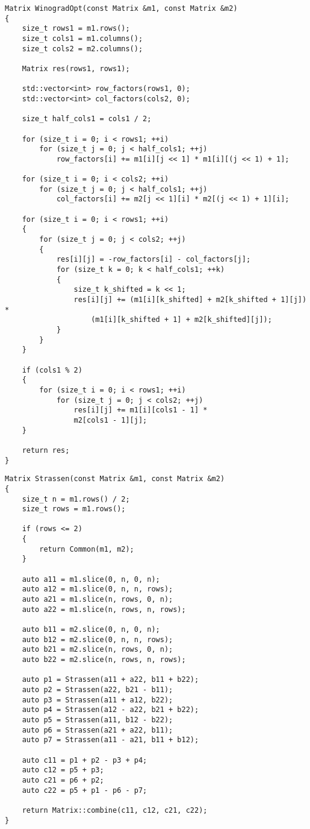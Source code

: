 \begin{lstlisting}[label={lst:winograd-opt}, caption={Реализация алгоритма Винограда с оптимизациями}]
Matrix WinogradOpt(const Matrix &m1, const Matrix &m2)
{
    size_t rows1 = m1.rows();
    size_t cols1 = m1.columns();
    size_t cols2 = m2.columns();

    Matrix res(rows1, rows1);

    std::vector<int> row_factors(rows1, 0);
    std::vector<int> col_factors(cols2, 0);

    size_t half_cols1 = cols1 / 2;

    for (size_t i = 0; i < rows1; ++i)
        for (size_t j = 0; j < half_cols1; ++j)
            row_factors[i] += m1[i][j << 1] * m1[i][(j << 1) + 1];

    for (size_t i = 0; i < cols2; ++i)
        for (size_t j = 0; j < half_cols1; ++j)
            col_factors[i] += m2[j << 1][i] * m2[(j << 1) + 1][i];

    for (size_t i = 0; i < rows1; ++i)
    {
        for (size_t j = 0; j < cols2; ++j)
        {
            res[i][j] = -row_factors[i] - col_factors[j];
            for (size_t k = 0; k < half_cols1; ++k)
            {
                size_t k_shifted = k << 1;
                res[i][j] += (m1[i][k_shifted] + m2[k_shifted + 1][j]) *
                    (m1[i][k_shifted + 1] + m2[k_shifted][j]);
            }
        }
    }

    if (cols1 % 2)
    {
        for (size_t i = 0; i < rows1; ++i)
            for (size_t j = 0; j < cols2; ++j)
                res[i][j] += m1[i][cols1 - 1] *
                m2[cols1 - 1][j];
    }

    return res;
}
\end{lstlisting}

\begin{lstlisting}[label={lst:strassen}, caption={Реализация алгоритма Штрассена}]
Matrix Strassen(const Matrix &m1, const Matrix &m2)
{
    size_t n = m1.rows() / 2;
    size_t rows = m1.rows();

    if (rows <= 2)
    {
        return Common(m1, m2);
    }

    auto a11 = m1.slice(0, n, 0, n);
    auto a12 = m1.slice(0, n, n, rows);
    auto a21 = m1.slice(n, rows, 0, n);
    auto a22 = m1.slice(n, rows, n, rows);

    auto b11 = m2.slice(0, n, 0, n);
    auto b12 = m2.slice(0, n, n, rows);
    auto b21 = m2.slice(n, rows, 0, n);
    auto b22 = m2.slice(n, rows, n, rows);

    auto p1 = Strassen(a11 + a22, b11 + b22);
    auto p2 = Strassen(a22, b21 - b11);
    auto p3 = Strassen(a11 + a12, b22);
    auto p4 = Strassen(a12 - a22, b21 + b22);
    auto p5 = Strassen(a11, b12 - b22);
    auto p6 = Strassen(a21 + a22, b11);
    auto p7 = Strassen(a11 - a21, b11 + b12);

    auto c11 = p1 + p2 - p3 + p4;
    auto c12 = p5 + p3;
    auto c21 = p6 + p2;
    auto c22 = p5 + p1 - p6 - p7;

    return Matrix::combine(c11, c12, c21, c22);
}
\end{lstlisting}

